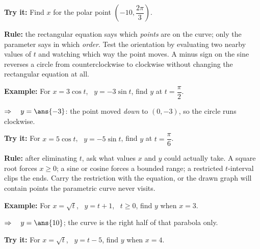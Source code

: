 \documentclass[12pt]{article}
\begin{document}
\begin{tryitbox}
\textbf{Try it:} \quad Find $x$ for the polar point $\left(-10, \dfrac{2\pi}{3}\right)$.\\[2pt]
\end{tryitbox}


\begin{formulabox}
\textbf{Rule:} the rectangular equation says which \emph{points} are on the curve; only the
parameter says in which \emph{order}. Test the orientation by evaluating two nearby values of
$t$ and watching which way the point moves. A minus sign on the sine reverses a circle from
counterclockwise to clockwise without changing the rectangular equation at all.
\end{formulabox}

\begin{examplebox}
\textbf{Example:} \quad For $x = 3\cos t$, \ $y = -3\sin t$, find $y$ at $t = \dfrac{\pi}{2}$.

$\Rightarrow\quad y = \ans{-3}$: the point moved \emph{down} to $(0, -3)$, so the circle runs clockwise.
\end{examplebox}

\begin{tryitbox}
\textbf{Try it:} \quad For $x = 5\cos t$, \ $y = -5\sin t$, find $y$ at $t = \dfrac{\pi}{6}$.\\[2pt]
\end{tryitbox}


\begin{formulabox}
\textbf{Rule:} after eliminating $t$, ask what values $x$ and $y$ could actually take.
A square root forces $x \ge 0$; a sine or cosine forces a bounded range; a restricted
$t$-interval clips the ends. Carry the restriction with the equation, or the drawn graph will
contain points the parametric curve never visits.
\end{formulabox}

\begin{examplebox}
\textbf{Example:} \quad For $x = \sqrt{t}$, \ $y = t + 1$, \ $t \ge 0$, find $y$ when $x = 3$.

$\Rightarrow\quad y = \ans{10}$; the curve is the right half of that parabola only.
\end{examplebox}

\begin{tryitbox}
\textbf{Try it:} \quad For $x = \sqrt{t}$, \ $y = t - 5$, find $y$ when $x = 4$.\\[2pt]
\end{tryitbox}
\end{document}
